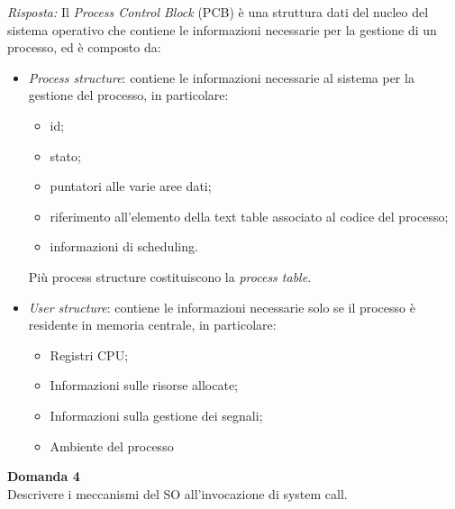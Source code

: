 \documentclass{article}
\newenvironment{problem}[2][Domanda]
    { \begin{mdframed}[backgroundcolor=gray!20] \textbf{#1 #2} \\}
    {  \end{mdframed}}
\newenvironment{solution}
    {\textit{Risposta:}}
    {}
\begin{document}
\begin{solution}
\newline
\newline
Il \textit{Process Control Block} (PCB) è una struttura dati del nucleo del sistema operativo che contiene le informazioni necessarie per la gestione di un processo, ed è composto da:
\begin{itemize}
    \item \emph{Process structure}: contiene le informazioni necessarie al sistema per la gestione del processo, in particolare:
    \begin{itemize}
        \item id;
        \item stato;
        \item puntatori alle varie aree dati;
        \item riferimento all'elemento della text table associato al codice del processo;
        \item informazioni di scheduling.
    \end{itemize} 
    Più process structure costituiscono la \textit{process table}. 
    \item \emph{User structure}: contiene le informazioni necessarie solo se il processo è residente in memoria centrale, in particolare:
    \begin{itemize}
        \item Registri CPU;
        \item Informazioni sulle risorse allocate;
        \item Informazioni sulla gestione dei segnali;
        \item Ambiente del processo
    \end{itemize}
\end{itemize}
\end{solution}
\begin{problem}{4}
Descrivere i meccanismi del SO all’invocazione di system call.
\end{problem}
\end{document}
